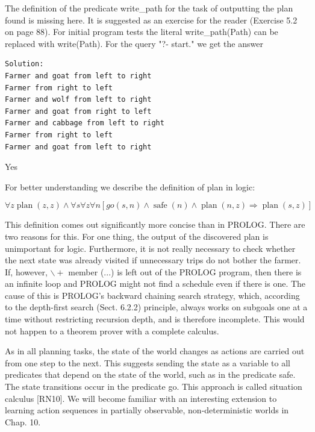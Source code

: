 \documentclass[10pt]{article}
\begin{document}
The definition of the predicate write\_path for the task of outputting the plan found is missing here. It is suggested as an exercise for the reader (Exercise 5.2 on page 88). For initial program tests the literal write\_path(Path) can be replaced with write(Path). For the query "?- start." we get the answer

\begin{verbatim}
Solution:
Farmer and goat from left to right
Farmer from right to left
Farmer and wolf from left to right
Farmer and goat from right to left
Farmer and cabbage from left to right
Farmer from right to left
Farmer and goat from left to right
\end{verbatim}

Yes

For better understanding we describe the definition of plan in logic:

$$
\forall z \operatorname{plan}(z, z) \wedge \forall s \forall z \forall n[g o(s, n) \wedge \operatorname{safe}(n) \wedge \operatorname{plan}(n, z) \Rightarrow \operatorname{plan}(s, z)]
$$

This definition comes out significantly more concise than in PROLOG. There are two reasons for this. For one thing, the output of the discovered plan is unimportant for logic. Furthermore, it is not really necessary to check whether the next state was already visited if unnecessary trips do not bother the farmer. If, however, $\backslash+$ member (...) is left out of the PROLOG program, then there is an infinite loop and PROLOG might not find a schedule even if there is one. The cause of this is PROLOG's backward chaining search strategy, which, according to the depth-first search (Sect. 6.2.2) principle, always works on subgoals one at a time without restricting recursion depth, and is therefore incomplete. This would not happen to a theorem prover with a complete calculus.

As in all planning tasks, the state of the world changes as actions are carried out from one step to the next. This suggests sending the state as a variable to all predicates that depend on the state of the world, such as in the predicate safe. The state transitions occur in the predicate go. This approach is called situation calculus [RN10]. We will become familiar with an interesting extension to learning action sequences in partially observable, non-deterministic worlds in Chap. 10.
\end{document}
